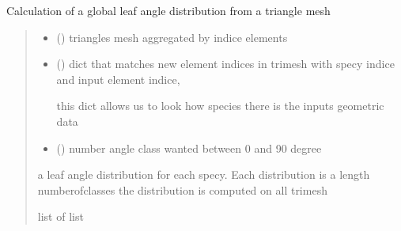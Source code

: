 \documentclass[letterpaper,10pt,english]{sphinxmanual}
\begin{document}
\begin{fulllineitems}
\label{\detokenize{reference:leafangles.compute_distrib_globale}}
\pysigstartsignatures
{}
\pysigstopsignatures
\sphinxAtStartPar
Calculation of a global leaf angle distribution from a triangle mesh
\begin{quote}\begin{description}
\begin{itemize}
\item {} 
\sphinxAtStartPar
{} () \textendash{} triangles mesh aggregated by indice elements 

\item {} 
\sphinxAtStartPar
{} () \textendash{} 
\sphinxAtStartPar
dict that matches new element indices in trimesh with specy indice and
input element indice, 

\sphinxAtStartPar
this dict allows us to look how species there is the inputs geometric data


\item {} 
\sphinxAtStartPar
{} () \textendash{} number angle class wanted between 0 and 90 degree

\end{itemize}

\sphinxAtStartPar
a leaf angle distribution for each specy. Each distribution is a length numberofclasses the distribution is computed on all trimesh

\sphinxAtStartPar
list of list

\end{description}\end{quote}

\end{fulllineitems}

\end{document}
